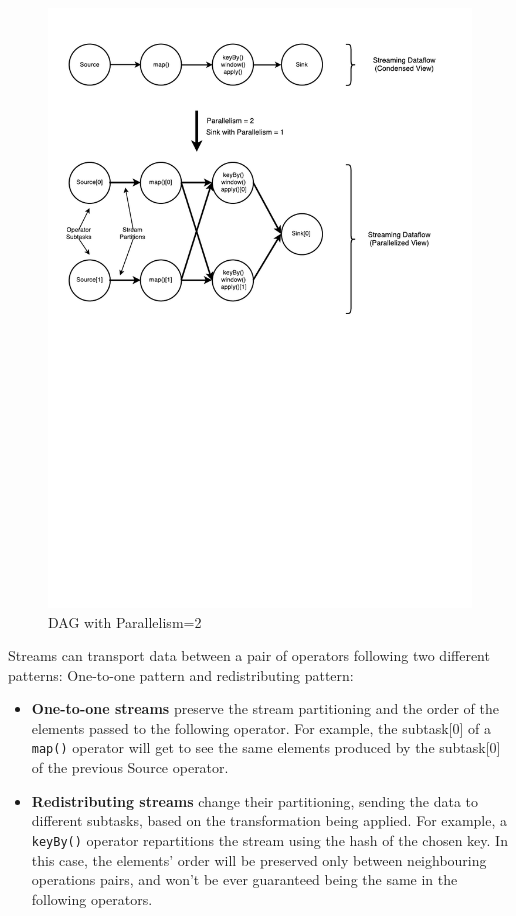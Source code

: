\begin{figure}[!htb]
    \centering
    \includegraphics[scale=0.75, trim=0.5cm 12cm 1cm 0.5cm]{Figures/parallel_dataflow.pdf}
    \decoRule
    \caption[Parallel Dataflow]{DAG with Parallelism=2}
    \label{fig:ParallelDataflow}
\end{figure}

Streams can transport data between a pair of operators following two different patterns: One-to-one pattern and redistributing pattern:
\begin{itemize}
	\item \textbf{One-to-one streams} preserve the stream partitioning and the order of the elements passed to the following operator. For example, the subtask[0] of a \texttt{map()} operator will get to see the same elements produced by the subtask[0] of the previous Source operator.
   
    \item \textbf{Redistributing streams} change their partitioning, sending the data to different subtasks, based on the transformation being applied. For example, a \texttt{keyBy()} operator repartitions the stream using the hash of the chosen key. In this case, the elements' order will be preserved only between neighbouring operations pairs, and won't be ever guaranteed being the same in the following operators.
\end{itemize}

